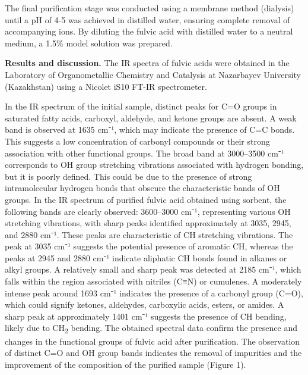 \begin{multicols}{2}
The final purification stage was conducted using a membrane method
(dialysis) until a pH of 4-5 was achieved in distilled water, ensuring
complete removal of accompanying ions. By diluting the fulvic acid with
distilled water to a neutral medium, a 1.5\% model solution was
prepared.

{\bfseries Results and discussion.} The IR spectra of fulvic acids were
obtained in the Laboratory of Organometallic Chemistry and Catalysis at
Nazarbayev University (Kazakhstan) using a Nicolet iS10 FT-IR
spectrometer.

In the IR spectrum of the initial sample, distinct peaks for C=O groups
in saturated fatty acids, carboxyl, aldehyde, and ketone groups are
absent. A weak band is observed at 1635 cm⁻¹, which may indicate the
presence of C=C bonds. This suggests a low concentration of carbonyl
compounds or their strong association with other functional groups. The
broad band at 3000--3500 cm⁻¹ corresponds to OH group stretching
vibrations associated with hydrogen bonding, but it is poorly defined.
This could be due to the presence of strong intramolecular hydrogen
bonds that obscure the characteristic bands of OH groups. In the IR
spectrum of purified fulvic acid obtained using sorbent, the following
bands are clearly observed: 3600--3000 cm⁻¹, representing various OH
stretching vibrations, with sharp peaks identified approximately at
3035, 2945, and 2880 cm⁻¹. These peaks are characteristic of CH
stretching vibrations. The peak at 3035 cm⁻¹ suggests the potential
presence of aromatic CH, whereas the peaks at 2945 and 2880 cm⁻¹
indicate aliphatic CH bonds found in alkanes or alkyl groups. A
relatively small and sharp peak was detected at 2185 cm⁻¹, which falls
within the region associated with nitriles (C≡N) or cumulenes. A
moderately intense peak around 1693 cm⁻¹ indicates the presence of a
carbonyl group (C=O), which could signify ketones, aldehydes, carboxylic
acids, esters, or amides. A sharp peak at approximately 1401 cm⁻¹
suggests the presence of CH bending, likely due to CH\textsubscript{2}
bending. The obtained spectral data confirm the presence and changes in
the functional groups of fulvic acid after purification. The observation
of distinct C=O and OH group bands indicates the removal of impurities
and the improvement of the composition of the purified sample (Figure
1).
\end{multicols}

